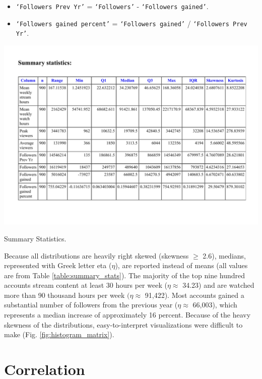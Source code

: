 \documentclass[12pt]{article}
\begin{document}
\begin{itemize}
	\item \texttt{`Followers Prev Yr’} = \texttt{`Followers’} - \texttt{`Followers gained’}.
	\item \texttt{`Followers gained percent’} = \texttt{`Followers gained’} / \texttt{`Followers Prev Yr’}.
\end{itemize}

\begin{table}[H]
  \centering
  \includegraphics[width=0.8\linewidth]{../StatCrunch_Results/table}
  \captionsetup{justification=centering, singlelinecheck=false, margin=2cm}
  \caption[Summary Statistics]{Summary Statistics.}
  \label{table:summary_stats}
\end{table}

Because all distributions are heavily right skewed (skewness $\geq$ 2.6), medians, represented with Greek letter eta ($\eta$), are reported instead of means (all values are from Table \ref{table:summary_stats}). The majority of the top nine hundred accounts stream content at least 30 hours per week ($\eta \approx$ 34.23) and are watched more than 90 thousand hours per week $(\eta \approx$ 91,422). Most accounts gained a substantial number of followers from the previous year ($\eta \approx$ 66,003), which represents a median increase of approximately 16 percent. Because of the heavy skewness of the distributions, easy-to-interpret visualizations were difficult to make (Fig. \ref{fig:histogram_matrix}).

\section{Correlation}
\end{document}
